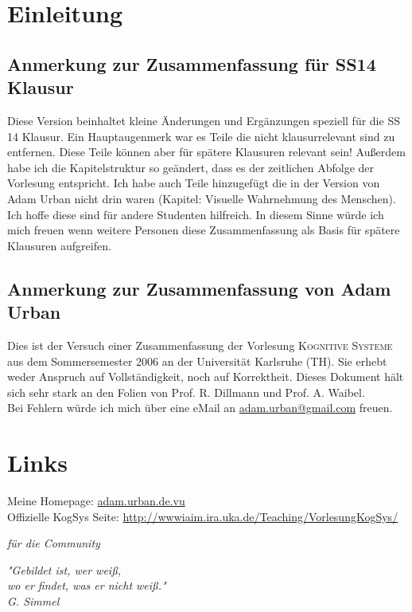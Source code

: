 
\section*{Einleitung}

\subsection*{Anmerkung zur Zusammenfassung für SS14 Klausur}
Diese Version beinhaltet kleine Änderungen und Ergänzungen speziell für die SS 14 Klausur. Ein Hauptaugenmerk war es Teile die nicht klausurrelevant sind zu entfernen. Diese Teile können aber für spätere Klausuren relevant sein! Außerdem habe ich die Kapitelstruktur so geändert, dass es der zeitlichen Abfolge der Vorlesung entspricht. Ich habe auch Teile hinzugefügt die in der Version von Adam Urban nicht drin waren (Kapitel: Visuelle Wahrnehmung des Menschen). Ich hoffe diese sind für andere Studenten hilfreich. In diesem Sinne würde ich mich freuen wenn weitere Personen diese Zusammenfassung als Basis für spätere Klausuren aufgreifen.


\subsection*{Anmerkung zur Zusammenfassung von Adam Urban}

Dies ist der Versuch einer Zusammenfassung der Vorlesung \textsc{Kognitive Systeme} aus dem Sommersemester 2006 an der Universität Karlsruhe (TH). Sie erhebt weder Anspruch auf Vollständigkeit, noch auf Korrektheit. Dieses Dokument hält sich sehr stark an den Folien von Prof. R. Dillmann und Prof. A. Waibel. \\
Bei Fehlern würde ich mich über eine eMail an \href{mailto:adam.urban@gmail.com}{adam.urban@gmail.com} freuen.

\section*{Links}

Meine Homepage: \hfill \href{http://adam.urban.de.vu/}{adam.urban.de.vu} \\[0,2cm]
Offizielle KogSys Seite: \hfill \href{http://wwwiaim.ira.uka.de/Teaching/VorlesungKogSys/}{http://wwwiaim.ira.uka.de/Teaching/VorlesungKogSys/}

\cleardoublepage

\pagestyle{empty}

\begin{flushright}
\textsl{für die Community}
\end{flushright}


\vspace{8cm}

\begin{center}
\textsl{"{}Gebildet ist, wer weiß, \\ wo er findet, was er nicht weiß."{} \\[0,5cm] \qquad \qquad \qquad \qquad G. Simmel}
\end{center}
